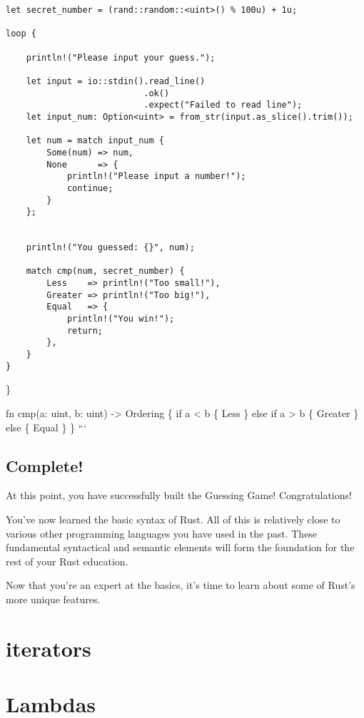 \documentclass[]{article}
\begin{document}
\begin{verbatim}
let secret_number = (rand::random::<uint>() % 100u) + 1u;

loop {

    println!("Please input your guess.");

    let input = io::stdin().read_line()
                           .ok()
                           .expect("Failed to read line");
    let input_num: Option<uint> = from_str(input.as_slice().trim());

    let num = match input_num {
        Some(num) => num,
        None      => {
            println!("Please input a number!");
            continue;
        }
    };


    println!("You guessed: {}", num);

    match cmp(num, secret_number) {
        Less    => println!("Too small!"),
        Greater => println!("Too big!"),
        Equal   => {
            println!("You win!");
            return;
        },
    }
}
\end{verbatim}

\}

fn cmp(a: uint, b: uint) -\textgreater{} Ordering \{ if a \textless{} b
\{ Less \} else if a \textgreater{} b \{ Greater \} else \{ Equal \} \}
```

\subsection{Complete!}\label{complete}

At this point, you have successfully built the Guessing Game!
Congratulations!

You've now learned the basic syntax of Rust. All of this is relatively
close to various other programming languages you have used in the past.
These fundamental syntactical and semantic elements will form the
foundation for the rest of your Rust education.

Now that you're an expert at the basics, it's time to learn about some
of Rust's more unique features.

\section{iterators}\label{iterators}

\section{Lambdas}\label{lambdas}
\end{document}
